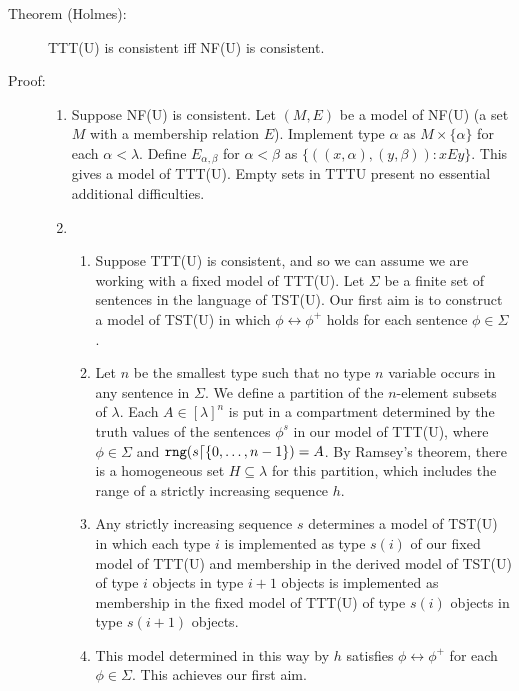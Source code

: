 \documentclass[112pt]{article}
\begin{document}
\begin{description}

\item[Theorem (Holmes):]  TTT(U) is consistent iff NF(U) is consistent.

\item[Proof:]  
\begin{enumerate}

\item Suppose NF(U) is consistent.  Let $(M,E)$ be a model of NF(U) (a set $M$ with a membership relation $E$).  Implement type $\alpha$ as $M \times \{\alpha\}$ for
each $\alpha<\lambda$.  Define $E_{\alpha,\beta}$ for $\alpha<\beta$ as $\{((x,\alpha),(y,\beta)):xEy\}$.  This gives a model of TTT(U).   Empty sets in TTTU present no essential additional difficulties.

\item \begin{enumerate}


\item Suppose TTT(U) is consistent, and so we can assume we are working with a fixed model of TTT(U).  Let $\Sigma$ be a finite set of sentences in the language of TST(U).  Our first aim is to construct a model of TST(U) in which $\phi \leftrightarrow \phi^+$ holds for each sentence $\phi \in \Sigma$.

\item Let $n$ be the smallest type such that no type $n$ variable occurs in any sentence in $\Sigma$.  We define a partition of the $n$-element subsets of $\lambda$.  Each $A \in [\lambda]^n$ is put in a compartment
determined by the truth values of the sentences $\phi^s$ in our model of TTT(U), where $\phi \in \Sigma$ and ${\tt rng}(s \lceil \{0,\ldots,n-1\}) = A$.  By Ramsey's theorem, there is a homogeneous set $H \subseteq \lambda$ for this partition, which includes the range of a strictly increasing sequence $h$.  

\item Any strictly increasing sequence $s$ determines a model of TST(U) in which each type $i$ is implemented as type $s(i)$ of our fixed model of TTT(U)  and membership in the derived model of TST(U) of type $i$ objects in type $i+1$ objects is implemented as membership in the fixed model of TTT(U) of type $s(i)$ objects in type $s(i+1)$ objects.

\item This model determined in this way by $h$ satisfies  $\phi \leftrightarrow \phi^+$ for each $\phi \in \Sigma$.   This achieves our first aim.


\end{enumerate}
\end{enumerate}
\end{description}
\end{document}
